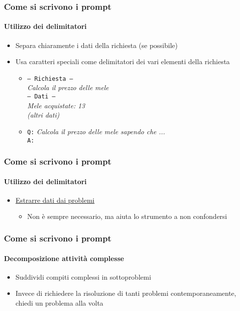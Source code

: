 \begin{contentframe}
    \frametitle{Come si scrivono i prompt}
    \framesubtitle{Utilizzo dei delimitatori}

    \begin{itemize}
        \item Separa chiaramente i dati della richiesta (se possibile)

        \bigskip
        \item Usa caratteri speciali come delimitatori dei vari elementi della richiesta
        \begin{itemize}
            \item \texttt{--- Richiesta ---}\\
                \textit{Calcola il prezzo delle mele}\\
                \texttt{--- Dati ---}\\
                \textit{Mele acquistate: 13}\\
                \textit{(altri dati)}

            \bigskip
            \item \texttt{Q:} \textit{Calcola il prezzo delle mele sapendo che ...}\\
                \texttt{A:}
        \end{itemize}
    \end{itemize}
\end{contentframe}

\begin{exampleframe}
    \frametitle{Come si scrivono i prompt}
    \framesubtitle{Utilizzo dei delimitatori}

    \begin{itemize}
        \item \href{https://chatgpt.com/share/675af550-6bb0-8003-966d-b7a36cb9fb6e}{Estrarre dati dai problemi}
        \begin{itemize}
            \item Non è sempre necessario, ma aiuta lo strumento a non confondersi
        \end{itemize}
    \end{itemize}
\end{exampleframe}

\begin{contentframe}
    \frametitle{Come si scrivono i prompt}
    \framesubtitle{Decomposizione attività complesse}

    \begin{itemize}
        \item Suddividi compiti complessi in sottoproblemi

        \bigskip
        \item Invece di richiedere la risoluzione di tanti problemi contemporaneamente, chiedi un problema alla volta
    \end{itemize}
\end{contentframe}

